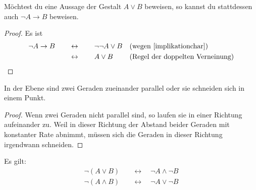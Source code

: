 \begin{satz}[*] \label{oderperimplikation}
    Möchtest du eine Aussage der Gestalt $A\lor B$ beweisen, so kannst du stattdessen auch $\neg A\to B$ beweisen.
\end{satz}
\begin{proof}
    Es ist
    \begin{align*}
        \neg A\to B \qquad &\leftrightarrow\qquad \neg\neg A\lor B && (\text{wegen \cref{implikationchar}})\\
        & \leftrightarrow\qquad A\lor B && (\text{Regel der doppelten Verneinung}) \qedhere
    \end{align*}
\end{proof}


\begin{bsp}[*]
    In der Ebene sind zwei Geraden zueinander parallel oder sie schneiden sich in einem Punkt.
\end{bsp}
\begin{proof}
    Wenn zwei Geraden nicht parallel sind, so laufen sie in einer Richtung aufeinander zu. Weil in dieser Richtung der Abstand beider Geraden mit konstanter Rate abnimmt, müssen sich die Geraden in dieser Richtung irgendwann schneiden.
\end{proof}


\begin{satz} \label{demorgan} 
    Es gilt:
    \begin{align*}
        \neg (A\lor B) \quad& \leftrightarrow\quad \neg A\land \neg B \\
        \neg(A\land B) \quad& \leftrightarrow\quad \neg A\lor \neg B
    \end{align*}
\end{satz}


